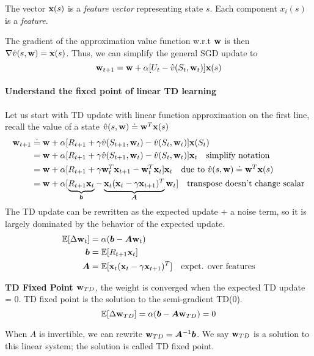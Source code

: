 \documentclass[sutton_barto_notes.tex]{subfiles}
\begin{document}
The vector ${\bx}(s)$ is a \textit{feature vector} representing state $s$. Each component $x_i(s)$ is a \textit{feature}.

The gradient of the approximation value function w.r.t ${\bw}$ is then $\nabla\hat{v}(s,{\bw})={\bx}(s)$.
Thus, we can simplify the general SGD update to
$${\bw}_{t+1} = {\bw} + \alpha[U_t - \hat{v}(S_t, {\bw}_t)]{\bx}(s)$$

\paragraph{Understand the fixed point of linear TD learning}

Let us start with TD update with linear function approximation on the first line, recall the value of a state $\hat{v}(s,{\bw}) \doteq {\bw}^T{\bx}(s)$
\begin{align*}
{\bw}_{t+1} &\doteq {\bw} + \alpha[R_{t+1} + \gamma\hat{v}(S_{t+1},{\bw}_t) - \hat{v}(S_t, {\bw}_t)]{\bx}(S_t) \\
&= {\bw} + \alpha[R_{t+1} + \gamma\hat{v}(S_{t+1},{\bw}_t) - \hat{v}(S_t, {\bw}_t)]{\bx}_t \quad \text{simplify notation}\\
&= {\bw} + \alpha[R_{t+1} + \gamma{\bw}_t^T{\bx}_{t+1} - {\bw}_t^T{\bx}_t]{\bx}_t \quad \text{due to }\hat{v}(s,{\bw}) \doteq {\bw}^T{\bx}(s)\\
&= {\bw} + \alpha[\underbrace{R_{t+1}{\bx}_t}_{\bm{b}} - \underbrace{{\bx}_t({\bx}_t - \gamma{\bx}_{t+1})^T}_{\bm{A}}{\bw}_t] \quad\text{transpose doesn't change scalar}\\
\end{align*}
The TD update can be rewritten as the expected update + a noise term, so it is largely dominated by the behavior of the expected update.
\begin{align*}
\E[\Delta {\bw}_t] &= \alpha(\bm{b} - \bm{A}{\bw}_t) \\
\bm{b} &= \E[R_{t+1}{\bx}_t] \\
\bm{A} &= \E[{\bx}_t({\bx}_t - \gamma{\bx}_{t+1})^T] \quad \text{expct. over features}
\end{align*}

\begin{definition}
\textbf{TD Fixed Point ${\bw}_{TD}$}, the weight is converged when the expected TD update = 0. TD fixed point is the solution to the semi-gradient TD(0).
$$\E[\Delta {\bw}_{TD}] = \alpha(\bm{b} - \bm{A}{\bw}_{TD}) = 0$$
\end{definition}
When $A$ is invertible, we can rewrite ${\bw}_{TD} = \bm{A}^{-1}\bm{b}$. We say ${\bw}_{TD}$ is a solution to this linear system; the solution is called TD fixed point.
\end{document}
